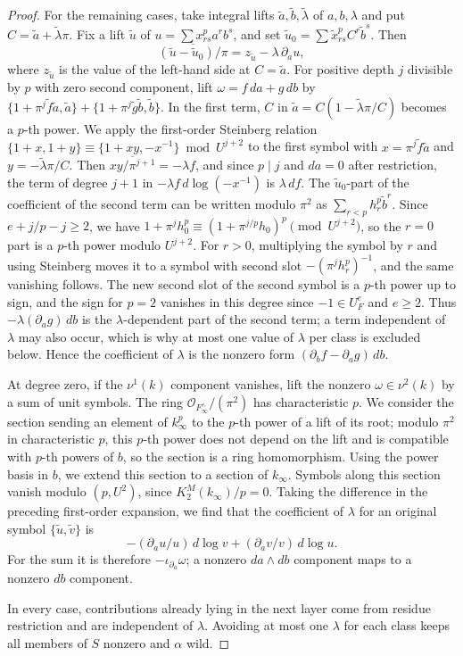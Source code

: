 \begin{proof}
For the remaining cases, take integral lifts $\widetilde a,\widetilde b,\widetilde\lambda$ of $a,b,\lambda$ and put $C=\widetilde a+\widetilde\lambda\pi$.
Fix a lift $\widetilde u$ of $u=\sum x_{rs}^p a^r b^s$, and set $\widetilde u_0=\sum \widetilde x_{rs}^pC^r\widetilde b^s$.
Then
\[
 \overline{(\widetilde u-\widetilde u_0)/\pi}=z_{\widetilde u}-\lambda\,\partial_a u,
\]
where $z_{\widetilde u}$ is the value of the left-hand side at $C=\widetilde a$.
For positive depth $j$ divisible by $p$ with zero second component, lift $\omega=f\,da+g\,db$ by $\{1+\pi^j\widetilde f \widetilde a,\widetilde a\}+ \{1+\pi^j\widetilde g \widetilde b,\widetilde b\}$.
In the first term, $C$ in $\widetilde a=C(1-\widetilde\lambda\pi/C)$ becomes a $p$-th power.
We apply the first-order Steinberg relation $\{1+x,1+y\}\equiv\{1+xy,-x^{-1}\}\bmod U^{j+2}$ \cite[(4.1.1)]{BlochKato1986} to the first symbol with $x=\pi^j\widetilde f\widetilde a$ and $y=-\widetilde\lambda\pi/C$.
Then $\overline{xy/\pi^{j+1}}=-\lambda f$, and since $p\mid j$ and $da=0$ after restriction, the term of degree $j+1$ in $-\lambda f\,d\log(-x^{-1})$ is $\lambda\,df$.
The $\widetilde u_0$-part of the coefficient of the second term can be written modulo $\pi^2$ as $\sum_{r<p}h_r^p \widetilde b^r$.
Since $e+j/p-j\ge2$, we have $1+\pi^jh_0^p\equiv(1+\pi^{j/p}h_0)^p\pmod{U^{j+2}}$, so the $r=0$ part is a $p$-th power modulo $U^{j+2}$.
For $r>0$, multiplying the symbol by $r$ and using Steinberg moves it to a symbol with second slot $-(\pi^j h_r^p)^{-1}$, and the same vanishing follows.
The new second slot of the second symbol is a $p$-th power up to sign, and the sign for $p=2$ vanishes in this degree since $-1\in U_F^e$ and $e\ge2$.
Thus $-\lambda(\partial_a g)\,db$ is the $\lambda$-dependent part of the second term; a term independent of $\lambda$ may also occur, which is why at most one value of $\lambda$ per class is excluded below.
Hence the coefficient of $\lambda$ is the nonzero form $(\partial_b f-\partial_a g)\,db$.

At degree zero, if the $\nu^1(k)$ component vanishes, lift the nonzero $\omega\in\nu^2(k)$ by a sum of unit symbols.
The ring $\mathcal O_{F_\infty^\wedge}/(\pi^2)$ has characteristic $p$.
We consider the section sending an element of $k_\infty^p$ to the $p$-th power of a lift of its root; modulo $\pi^2$ in characteristic $p$, this $p$-th power does not depend on the lift and is compatible with $p$-th powers of $b$, so the section is a ring homomorphism.
Using the power basis in $b$, we extend this section to a section of $k_\infty$.
Symbols along this section vanish modulo $(p,U^2)$, since $K_2^M(k_\infty)/p=0$.
Taking the difference in the preceding first-order expansion, we find that the coefficient of $\lambda$ for an original symbol $\{\widetilde u,\widetilde v\}$ is
\[
 -(\partial_a u/u)\,d\log v+(\partial_a v/v)\,d\log u.
\]
For the sum it is therefore $-\iota_{\partial_a}\omega$; a nonzero $da\wedge db$ component maps to a nonzero $db$ component.

In every case, contributions already lying in the next layer come from residue restriction and are independent of $\lambda$.
Avoiding at most one $\lambda$ for each class keeps all members of $S$ nonzero and $\alpha$ wild.
\end{proof}

